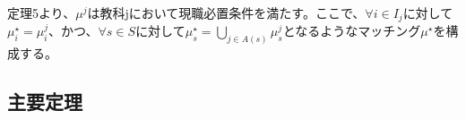 \documentclass[12pt, a4paper]{article}
\theoremstyle{definition}
\theoremstyle{remark}
\theoremstyle{plain}
\newtheorem{theorem}{定理}
\begin{document}
定理5より、$\mu^j$は教科jにおいて現職必置条件を満たす。ここで、$\forall i \in I_j$に対して$\mu^\star_i=\mu^j_i$、かつ、$\forall s \in S$に対して$\mu^\star_s = \bigcup\limits_{j \in A(s)} \mu^j_s$となるようなマッチング$\mu^\star$を構成する。








\subsection{主要定理}






\end{document}
